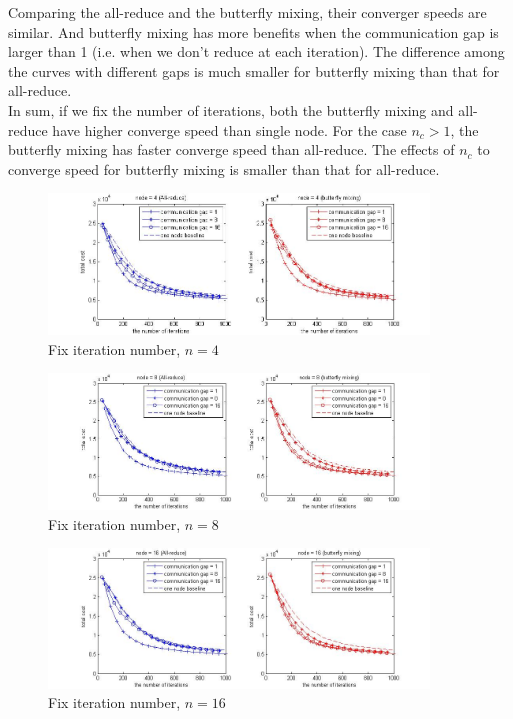 \documentclass{article}
\begin{document}
Comparing the all-reduce and the butterfly mixing, their converger speeds are similar. And butterfly mixing has more benefits when the communication gap is larger than 1 (i.e. when we don't reduce at each iteration). The difference among the curves with different gaps is much smaller for butterfly mixing than that for all-reduce. \\

In sum, if we fix the number of iterations, both the butterfly mixing and all-reduce have higher converge speed than single node. For the case $n_c > 1$, the butterfly mixing has faster converge speed than all-reduce. The effects of $n_c$ to converge speed for butterfly mixing is smaller than that for all-reduce. 


\begin{figure}
  
  \centering
    \includegraphics[width=0.9\textwidth]{batch20_node4_fixIter.jpg}
    \caption{Fix iteration number, $n = 4$}
\end{figure}

\begin{figure}
  
  \centering
    \includegraphics[width=0.9\textwidth]{batch20_node8_fixIter.jpg}
    \caption{Fix iteration number, $n = 8$}
\end{figure}
\begin{figure}
  
  \centering
    \includegraphics[width=0.9\textwidth]{batch20_node16_fixIter.jpg}
    \caption{Fix iteration number, $n = 16$}
\end{figure}
\end{document}
